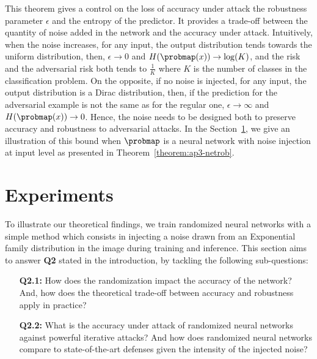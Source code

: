 \noindent
This theorem gives a control on the loss of accuracy under attack \wrt the robustness parameter $\epsilon$ and the entropy of the predictor.
It provides a trade-off between the quantity of noise added in the network and the accuracy under attack.
Intuitively, when the noise increases, for any input, the output distribution tends towards the uniform distribution, then, $\epsilon\rightarrow0$ and $H(\probmap(x))\rightarrow \log(K)$, and the risk and the adversarial risk both tends to $\frac{1}{K}$ where $K$ is the number of classes in the classification problem.
On the opposite, if no noise is injected, for any input, the output distribution is a  Dirac distribution, then, if the prediction for the adversarial example is not the same as for the regular one, $\epsilon\rightarrow\infty$ and $H(\probmap(x))\rightarrow 0$.
Hence, the noise needs to be designed both to preserve accuracy and robustness to adversarial attacks.
In the Section~\ref{section:ap3-experiment}, we give an illustration of this bound when $\probmap$ is a neural network with noise injection at input level as presented in Theorem~\ref{theorem:ap3-netrob}.

\section{Experiments}
\label{section:ap3-experiment}

To illustrate our theoretical findings, we train randomized neural networks with a simple method which consists in injecting a noise drawn from an Exponential family distribution in the image during training and inference.
This section aims to answer \textbf{Q2} stated in the introduction, by tackling the following sub-questions:
\begin{itemize}[leftmargin=12mm]
  \item[\textbf{Q2.1:}] How does the randomization impact the accuracy of the network? And, how does the theoretical trade-off between accuracy and robustness apply in practice? 
  \item[\textbf{Q2.2:}] What is the accuracy under attack of randomized neural networks against powerful iterative attacks? And how does randomized neural networks compare to state-of-the-art defenses given the intensity of the injected noise? 
\end{itemize}

